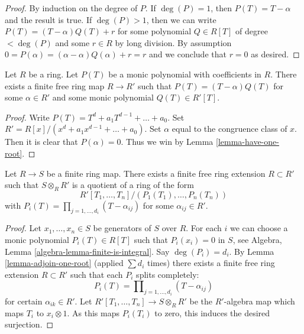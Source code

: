\begin{proof}
By induction on the degree of $P$. If $\deg(P) = 1$, then
$P(T) = T - \alpha$ and the result is true. If $\deg(P) > 1$, then
we can write $P(T) = (T - \alpha)Q(T) + r$ for some polynomial
$Q \in R[T]$ of degree $< \deg(P)$ and some $r \in R$ by long
division. By assumption $0 = P(\alpha) = (\alpha - \alpha)Q(\alpha) + r = r$
and we conclude that $r = 0$ as desired.
\end{proof}

\begin{lemma}
\label{lemma-adjoin-one-root}
Let $R$ be a ring. Let $P(T)$ be a monic polynomial with coefficients
in $R$. There exists a finite free ring map $R \to R'$ such that
$P(T) = (T - \alpha)Q(T)$ for some $\alpha \in R'$ and some
monic polynomial $Q(T) \in R'[T]$.
\end{lemma}

\begin{proof}
Write $P(T) = T^d + a_1T^{d - 1} + \ldots + a_0$.
Set $R' = R[x]/(x^d + a_1x^{d - 1} + \ldots + a_0)$.
Set $\alpha$ equal to the congruence class of $x$.
Then it is clear that $P(\alpha) = 0$. Thus we win by
Lemma \ref{lemma-have-one-root}.
\end{proof}

\begin{lemma}
\label{lemma-finite-split}
Let $R \to S$ be a finite ring map.
There exists a finite free ring extension $R \subset R'$ such
that $S \otimes_R R'$ is a quotient of a ring of the form
$$
R'[T_1, \ldots, T_n]/(P_1(T_1), \ldots, P_n(T_n))
$$
with $P_i(T) = \prod_{j = 1, \ldots, d_i} (T - \alpha_{ij})$ for some
$\alpha_{ij} \in R'$.
\end{lemma}

\begin{proof}
Let $x_1, \ldots, x_n \in S$ be generators of $S$ over $R$.
For each $i$ we can choose a monic polynomial $P_i(T) \in R[T]$
such that $P_i(x_i) = 0$ in $S$, see
Algebra, Lemma \ref{algebra-lemma-finite-is-integral}.
Say $\deg(P_i) = d_i$. By
Lemma \ref{lemma-adjoin-one-root}
(applied $\sum d_i$ times) there exists a finite free ring
extension $R \subset R'$ such that each $P_i$ splits completely:
$$
P_i(T) = \prod\nolimits_{j = 1, \ldots, d_i} (T - \alpha_{ij})
$$
for certain $\alpha_{ik} \in R'$. Let
$R'[T_1, \ldots, T_n] \to S \otimes_R R'$ be the $R'$-algebra map
which maps $T_i$ to $x_i \otimes 1$. As this maps $P_i(T_i)$ to zero,
this induces the desired surjection.
\end{proof}

